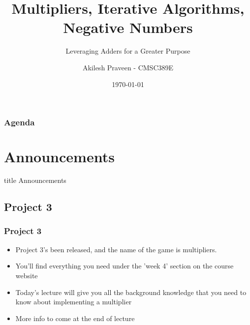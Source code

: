 \documentclass{beamer}
\title{Multipliers, Iterative Algorithms, Negative Numbers}
\subtitle{Leveraging Adders for a Greater Purpose}
\author[A Praveen]{Akilesh Praveen - CMSC389E}
\institute{UMD}
\date{\today}
\begin{document}
    \begin{frame}
        \titlepage
    \end{frame}
    
    \begin{frame}
        \frametitle{Agenda}
        \tableofcontents
    \end{frame}
    
    \section{Announcements}
    
        \begin{frame}
                \vfill
                \centering
                \begin{beamercolorbox}[sep=8pt,center,shadow=true,rounded=true]{title}
                    Announcements\par%
                \end{beamercolorbox}
                \vfill
             \end{frame}
    
        \subsection{Project 3}
        
            
            
            \begin{frame}
                \frametitle{Project 3}
                \begin{itemize}
                    \item Project 3's been released, and the name of the game is multipliers.
                    \item You'll find everything you need under the 'week 4' section on the course website
                    \item Today's lecture will give you all the background knowledge that you need to know about implementing a multiplier
                    
                    \item More info to come at the end of lecture
                    
                \end{itemize}
            \end{frame}
            
\end{document}
